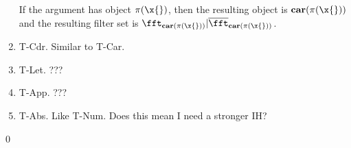 \documentclass{article}[12pt]
\begin{document}
\begin{enumerate}
  If the argument has
  object $\pi(\x{})$, then the resulting object is $\pecar(\pi(\x{}))$
  and the resulting filter set is $\fft_{\pecar(\pi(\x{}))}|\comp{\fft}_{\pecar(\pi(\x{}))}$.
\item {\sc T-Cdr}. Similar to {\sc T-Car}.
\item {\sc T-Let}. ???
\item {\sc T-App}. ???
\item {\sc T-Abs}. Like {\sc T-Num}.  Does this mean I need a stronger IH?
\end{enumerate}
\qed 
\end{document}
